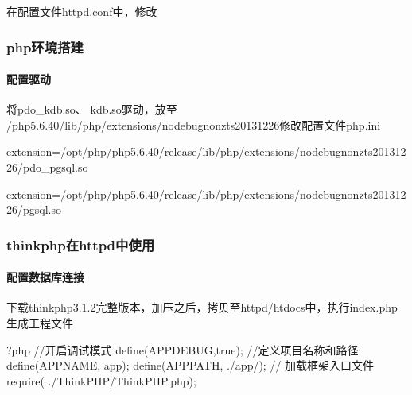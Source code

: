 \documentclass[a4,10pt,oneside,english]{sphinxmanual}
\begin{document}
在配置文件httpd.conf中，修改

\begin{sphinxVerbatim}[commandchars=\\\{\}]
 
\end{sphinxVerbatim}


\subsubsection{php环境搭建}
\label{\detokenize{interface/thinkPHP:php}}

\paragraph{配置驱动}
\label{\detokenize{interface/thinkPHP:id2}}
将pdo\_kdb.so、 kdb.so驱动，放至
/php\sphinxhyphen{}5.6.40/lib/php/extensions/no\sphinxhyphen{}debug\sphinxhyphen{}non\sphinxhyphen{}zts\sphinxhyphen{}20131226修改配置文件php.ini

extension=/opt/php/php\sphinxhyphen{}5.6.40/release/lib/php/extensions/no\sphinxhyphen{}debug\sphinxhyphen{}non\sphinxhyphen{}zts\sphinxhyphen{}20131226/pdo\_pgsql.so

extension=/opt/php/php\sphinxhyphen{}5.6.40/release/lib/php/extensions/no\sphinxhyphen{}debug\sphinxhyphen{}non\sphinxhyphen{}zts\sphinxhyphen{}20131226/pgsql.so


\subsubsection{thinkphp在httpd中使用}
\label{\detokenize{interface/thinkPHP:thinkphphttpd}}

\paragraph{配置数据库连接}
\label{\detokenize{interface/thinkPHP:id3}}
下载thinkphp3.1.2完整版本，加压之后，拷贝至httpd/htdocs中，执行index.php生成工程文件

\begin{sphinxVerbatim}[commandchars=\\\{\}]
\PYGZlt{}?php
//开启调试模式
define(\PYGZsq{}APP\PYGZus{}DEBUG\PYGZsq{},true);
//定义项目名称和路径
define(\PYGZsq{}APP\PYGZus{}NAME\PYGZsq{}, \PYGZsq{}app\PYGZsq{});
define(\PYGZsq{}APP\PYGZus{}PATH\PYGZsq{}, \PYGZsq{}./app/\PYGZsq{});
// 加载框架入口文件
require( \PYGZdq{}./ThinkPHP/ThinkPHP.php\PYGZdq{});
\end{sphinxVerbatim}
\end{document}
